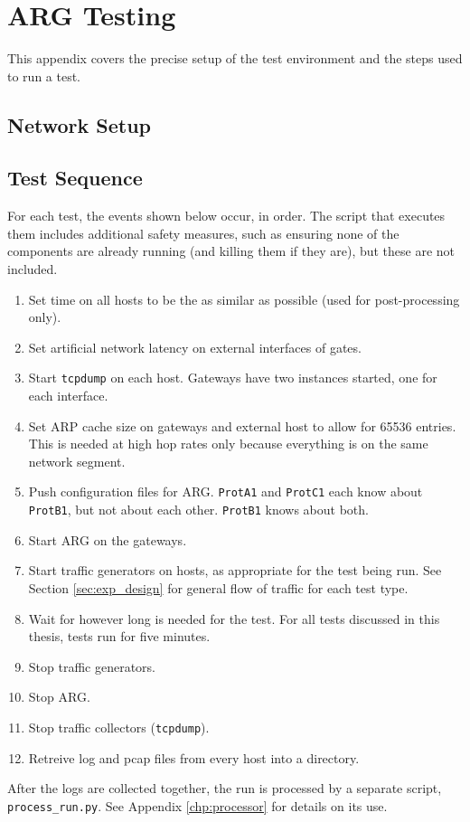 \chapter{\ac{ARG} Testing}
\label{chp:testseq}
\par This appendix covers the precise setup of the test environment and the steps used to run a test. 

\section{Network Setup}
\par 

\section{Test Sequence}
\par For each test, the events shown below occur, in order. The script that executes them includes additional safety measures, such as ensuring none of the components are already running (and killing them if they are), but these are not included.

\begin{enumerate}
\item Set time on all hosts to be the as similar as possible (used for post-processing only).
\item Set artificial network latency on external interfaces of gates.
\item Start \texttt{tcpdump} on each host. Gateways have two instances started, one for each interface. 
\item Set \ac{ARP} cache size on gateways and external host to allow for 65536 entries. This is needed at high hop rates only because everything is on the same network segment.
\item Push configuration files for \ac{ARG}. \texttt{ProtA1} and \texttt{ProtC1} each know about \texttt{ProtB1}, but not about each other. \texttt{ProtB1} knows about both.
\item Start \ac{ARG} on the gateways. 
\item Start traffic generators on hosts, as appropriate for the test being run. See Section \ref{sec:exp_design} for general flow of traffic for each test type.
\item Wait for however long is needed for the test. For all tests discussed in this thesis, tests run for five minutes.
\item Stop traffic generators.
\item Stop \ac{ARG}.
\item Stop traffic collectors (\texttt{tcpdump}).
\item Retreive log and pcap files from every host into a directory.
\end{enumerate}

\par After the logs are collected together, the run is processed by a separate script, \texttt{process\_run.py}. See Appendix \ref{chp:processor} for details on its use. 

